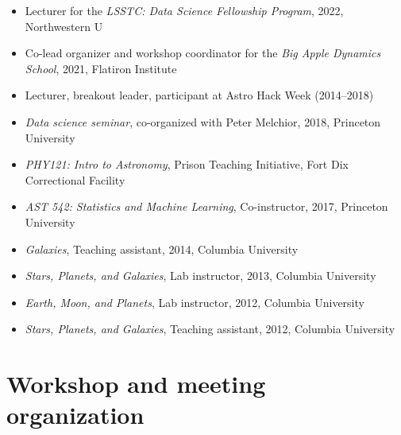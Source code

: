 \documentclass[12pt, letterpaper]{apw-cv}
\begin{document}
\begin{itemize}
    \item Lecturer for the \textit{LSSTC: Data Science Fellowship Program}, 2022, Northwestern U
    \item Co-lead organizer and workshop coordinator for the \textit{Big Apple Dynamics School}, 2021, Flatiron Institute
    \item Lecturer, breakout leader, participant at Astro Hack Week (2014--2018)
    \item \emph{Data science seminar}, co-organized with Peter Melchior, 2018, Princeton University
    \item \emph{PHY121: Intro to Astronomy}, Prison Teaching Initiative, Fort Dix Correctional Facility
	\item \emph{AST 542: Statistics and Machine Learning}, Co-instructor, 2017, Princeton University
    \item \emph{Galaxies}, Teaching assistant, 2014, Columbia University
	\item \emph{Stars, Planets, and Galaxies}, Lab instructor, 2013, Columbia University
	\item \emph{Earth, Moon, and Planets}, Lab instructor, 2012, Columbia University
	\item \emph{Stars, Planets, and Galaxies}, Teaching assistant, 2012, Columbia University
\end{itemize}

\section*{Workshop and meeting organization}
\end{document}
